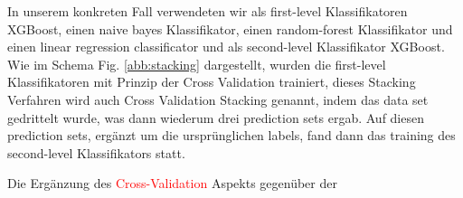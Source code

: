 In unserem konkreten Fall verwendeten wir als first-level Klassifikatoren XGBoost, einen naive bayes Klassifikator, einen random-forest Klassifikator und einen linear regression classificator und als second-level Klassifikator XGBoost. Wie im Schema Fig. \ref{abb:stacking} dargestellt, wurden die first-level Klassifikatoren mit Prinzip der Cross Validation trainiert, dieses Stacking Verfahren wird auch Cross Validation Stacking genannt, indem das data set gedrittelt wurde, was dann wiederum drei prediction sets ergab. Auf diesen prediction sets, ergänzt um die ursprünglichen labels, fand dann das training des second-level Klassifikators statt.

Die Ergänzung des \textcolor{red}{Cross-Validation} Aspekts gegenüber der 